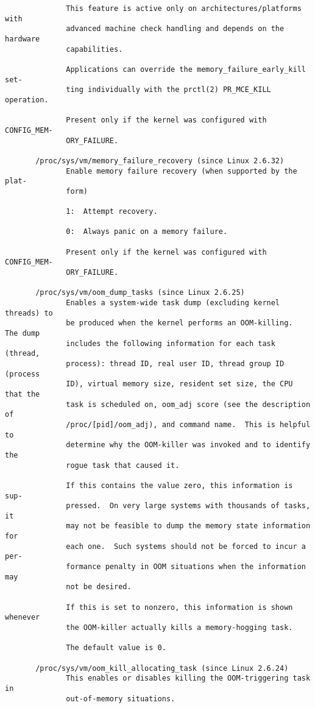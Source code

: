 \documentclass[]{article}
\begin{document}
\begin{verbatim}
              This feature is active only on architectures/platforms with
              advanced machine check handling and depends on the hardware
              capabilities.

              Applications can override the memory_failure_early_kill set‐
              ting individually with the prctl(2) PR_MCE_KILL operation.

              Present only if the kernel was configured with CONFIG_MEM‐
              ORY_FAILURE.

       /proc/sys/vm/memory_failure_recovery (since Linux 2.6.32)
              Enable memory failure recovery (when supported by the plat‐
              form)

              1:  Attempt recovery.

              0:  Always panic on a memory failure.

              Present only if the kernel was configured with CONFIG_MEM‐
              ORY_FAILURE.

       /proc/sys/vm/oom_dump_tasks (since Linux 2.6.25)
              Enables a system-wide task dump (excluding kernel threads) to
              be produced when the kernel performs an OOM-killing.  The dump
              includes the following information for each task (thread,
              process): thread ID, real user ID, thread group ID (process
              ID), virtual memory size, resident set size, the CPU that the
              task is scheduled on, oom_adj score (see the description of
              /proc/[pid]/oom_adj), and command name.  This is helpful to
              determine why the OOM-killer was invoked and to identify the
              rogue task that caused it.

              If this contains the value zero, this information is sup‐
              pressed.  On very large systems with thousands of tasks, it
              may not be feasible to dump the memory state information for
              each one.  Such systems should not be forced to incur a per‐
              formance penalty in OOM situations when the information may
              not be desired.

              If this is set to nonzero, this information is shown whenever
              the OOM-killer actually kills a memory-hogging task.

              The default value is 0.

       /proc/sys/vm/oom_kill_allocating_task (since Linux 2.6.24)
              This enables or disables killing the OOM-triggering task in
              out-of-memory situations.


\end{verbatim}
\end{document}
